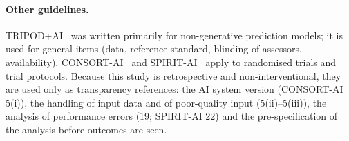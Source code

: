 \paragraph{Other guidelines.} TRIPOD+AI~\cite{collins2024tripodai} was written primarily for non-generative prediction
models; it is used for general items (data, reference standard, blinding of assessors, availability).
CONSORT-AI~\cite{liu2020consortai} and SPIRIT-AI~\cite{rivera2020spiritai} apply to randomised trials and trial
protocols. Because this study is retrospective and non-interventional, they are used only as transparency references:
the AI system version (CONSORT-AI 5(i)), the handling of input data and of poor-quality input (5(ii)--5(iii)), the
analysis of performance errors (19; SPIRIT-AI 22) and the pre-specification of the analysis before outcomes are seen.
